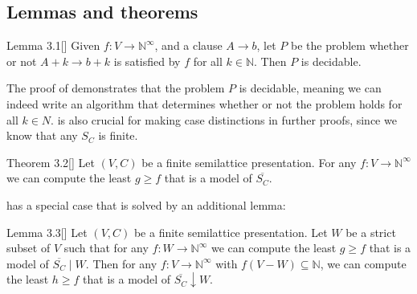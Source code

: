 \subsection{Lemmas and theorems}
\label{ssec:lemmas_and_theorems}

\begin{customlem}{Lemma 3.1}[{\cite[p.~3]{mbezem}}]
\label{lem:3.1}
Given $f : V \rightarrow \mathbb{N}^{\infty}$,
and a clause $A \rightarrow b$, let $P$ be the problem whether or not
$A + k \rightarrow b + k$ is satisfied by $f$ for all $k \in \mathbb{N}$.
Then $P$ is decidable.
\end{customlem}

The proof of  demonstrates that the problem $P$
is decidable, meaning we can indeed write an algorithm that
determines whether or not the problem holds for all $k \in N$.
 is also crucial for making case distinctions
in further proofs, since we know that any $S_C$ is finite.

\begin{customthm}{Theorem 3.2}[{\cite[p.~3]{mbezem}}]
\label{thm:3.2}
Let $(V, C)$ be a finite semilattice presentation.
For any $f : V \rightarrow \mathbb{N}^{\infty}$
we can compute the least $g \ge f$ that is a model of $\overline{S_C}$.
\end{customthm}

 has a special case that is solved by an additional lemma:

\begin{customlem}{Lemma 3.3}[{\cite[p.~3]{mbezem}}]
\label{lem:3.3}
Let $(V, C)$ be a finite semilattice presentation.
Let $W$ be a strict subset of $V$ such that for any
$f : W \rightarrow \mathbb{N}^{\infty}$ we can
compute the least $g \geq f$ that is a model of $\overline{S_C} \mid W$.
Then for any $f : V \rightarrow \mathbb{N}^{\infty}$ with $f(V - W) \subseteq \mathbb{N}$,
we can compute the least $h \geq f$ that is a model of $\overline{S_C} \downarrow W$.
\end{customlem}
